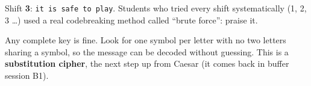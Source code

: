 \begin{answer}
Shift \textbf{3}: \texttt{it is safe to play}. Students who tried every shift systematically (1, 2, 3 \ldots) used a real codebreaking method
called \enquote{brute force}: praise it.
\end{answer}

\begin{answer}
Any complete key is fine. Look for one symbol per letter with no two letters sharing a symbol, so the message can be decoded
without guessing. This is a \textbf{substitution cipher}, the next step up from Caesar (it comes back in buffer session B1).
\end{answer}
